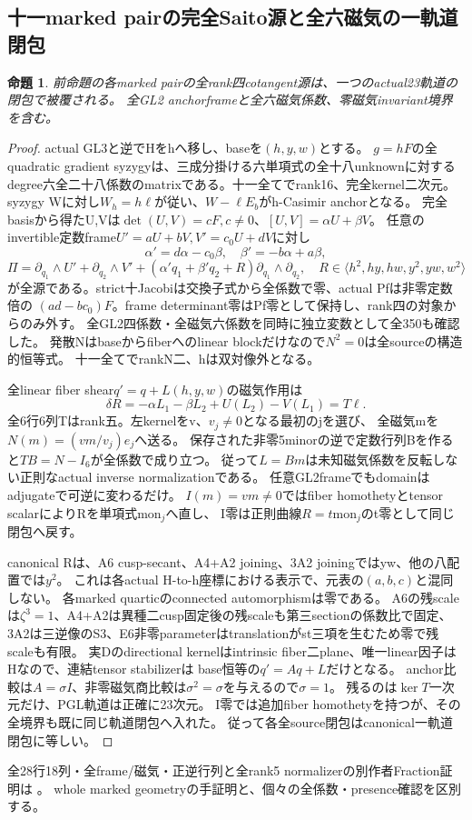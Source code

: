\documentclass[a4paper,11pt]{ltjsarticle}
\newtheorem{proposition}{命題}[section]
\theoremstyle{definition}
\begin{document}
\subsection{十一marked pairの完全Saito源と全六磁気の一軌道閉包}
\begin{proposition}\label{prop:marked-quartic-mu6-whole-sources}
前命題の各marked pairの全rank四cotangent源は、一つのactual23軌道の閉包で被覆される。
全GL2 anchorframeと全六磁気係数、零磁気invariant境界を含む。
\end{proposition}
\begin{proof}
actual GL3と逆でHをhへ移し、baseを$(h,y,w)$とする。
$g=hF$の全quadratic gradient syzygyは、三成分掛ける六単項式の全十八unknownに対する
degree六全二十八係数のmatrixである。十一全てでrank16、完全kernel二次元。
syzygy Wに対し$W_h=h\ell$が従い、$W-\ell E_b$がh-Casimir anchorとなる。
完全basisから得たU,Vは$\det(U,V)=cF,c\ne0$、$[U,V]=\alpha U+\beta V$。
任意のinvertible定数frame$U'=aU+bV,V'=c_0U+dV$に対し
\[
 \alpha'=d\alpha-c_0\beta,\quad\beta'=-b\alpha+a\beta,
\]
\[
 \Pi=\partial_{q_1}\wedge U'+\partial_{q_2}\wedge V'
 +(\alpha'q_1+\beta'q_2+R)\partial_{q_1}\wedge\partial_{q_2},
 \quad R\in\langle h^2,hy,hw,y^2,yw,w^2\rangle
\]
が全源である。strict十Jacobiは交換子式から全係数で零、actual Pfは非零定数倍の
$(ad-bc_0)F$。frame determinant零はPf零として保持し、rank四の対象からのみ外す。
全GL2四係数・全磁気六係数を同時に独立変数として全350も確認した。
発散Nはbaseからfiberへのlinear blockだけなので$N^2=0$は全sourceの構造的恒等式。
十一全てでrankN二、hは双対像外となる。

全linear fiber shear$q'=q+L(h,y,w)$の磁気作用は
\[
 \delta R=-\alpha L_1-\beta L_2+U(L_2)-V(L_1)=T\ell.
\]
全6行6列Tはrank五。左kernelをv、$v_j\ne0$となる最初のjを選び、
全磁気mを$N(m)=(vm/v_j)e_j$へ送る。
保存された非零5minorの逆で定数行列Bを作ると$TB=N-I_6$が全係数で成り立つ。
従って$L=Bm$は未知磁気係数を反転しない正則なactual inverse normalizationである。
任意GL2frameでもdomainはadjugateで可逆に変わるだけ。
$I(m)=vm\ne0$ではfiber homothetyとtensor scalarによりRを単項式$\mathrm{mon}_j$へ直し、
I零は正則曲線$R=t\mathrm{mon}_j$のt零として同じ閉包へ戻す。

canonical Rは、A6 cusp-secant、A4+A2 joining、3A2 joiningではyw、他の八配置では$y^2$。
これは各actual H-to-h座標における表示で、元表の$(a,b,c)$と混同しない。
各marked quarticのconnected automorphismは零である。
A6の残scaleは$\zeta^3=1$、A4+A2は異種二cusp固定後の残scaleも第三sectionの係数比で固定、
3A2は三逆像のS3、E6非零parameterはtranslationがst三項を生むため零で残scaleも有限。
実Dのdirectional kernelはintrinsic fiber二plane、唯一linear因子はHなので、連結tensor stabilizerは
base恒等の$q'=Aq+L$だけとなる。
anchor比較は$A=\sigma I$、非零磁気商比較は$\sigma^2=\sigma$を与えるので$\sigma=1$。
残るのは$\ker T$一次元だけ、PGL軌道は正確に23次元。
I零では追加fiber homothetyを持つが、その全境界も既に同じ軌道閉包へ入れた。
従って各全source閉包はcanonical一軌道閉包に等しい。
\end{proof}
全28行18列・全frame/磁気・正逆行列と全rank5 normalizerの別作者Fraction証明は
。
whole marked geometryの手証明と、個々の全係数・presence確認を区別する。
\end{document}
